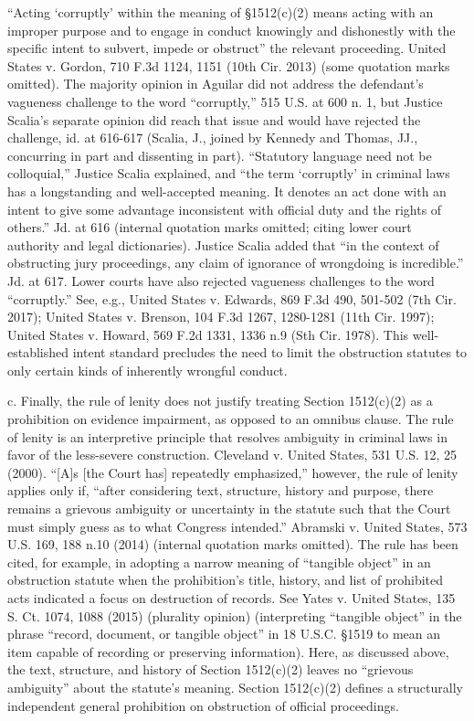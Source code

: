 “Acting ‘corruptly’ within the meaning of \S 1512(c)(2) means acting with an improper purpose and to engage in conduct knowingly and dishonestly with the specific intent to subvert, impede or obstruct” the relevant proceeding.
United States v. Gordon, 710 F.3d 1124, 1151 (10th Cir. 2013) (some quotation marks omitted).
The majority opinion in Aguilar did not address the defendant’s vagueness challenge to the word “corruptly,” 515 U.S. at 600 n. 1, but Justice Scalia’s separate opinion did reach that issue and would have rejected the challenge, id. at 616-617 (Scalia, J., joined by Kennedy and Thomas, JJ., concurring in part and dissenting in part).
“Statutory language need not be colloquial,” Justice Scalia explained, and “the term ‘corruptly’ in criminal laws has a longstanding and well-accepted meaning.
It denotes an act done with an intent to give some advantage inconsistent with official duty and the rights of others.” Jd. at 616 (internal quotation marks omitted; citing lower court authority and legal dictionaries).
Justice Scalia added that “in the context of obstructing jury proceedings, any claim of ignorance of wrongdoing is incredible.” Jd. at 617.
Lower courts have also rejected vagueness challenges to the word “corruptly.” See, e.g., United States v. Edwards, 869 F.3d 490, 501-502 (7th Cir. 2017); United States v. Brenson, 104 F.3d 1267, 1280-1281 (11th Cir. 1997); United States v. Howard, 569 F.2d 1331, 1336 n.9 (Sth Cir. 1978).
This well-established intent standard precludes the need to limit the obstruction statutes to only certain kinds of inherently wrongful conduct.%

c. Finally, the rule of lenity does not justify treating Section 1512(c)(2) as a prohibition on evidence impairment, as opposed to an omnibus clause.
The rule of lenity is an interpretive principle that resolves ambiguity in criminal laws in favor of the less-severe construction.
Cleveland v. United States, 531 U.S. 12, 25 (2000).
“[A]s [the Court has] repeatedly emphasized,” however, the rule of lenity applies only if, “after considering text, structure, history and purpose, there remains a grievous ambiguity or uncertainty in the statute such that the Court must simply guess as to what Congress intended.” Abramski v. United States, 573 U.S. 169, 188 n.10 (2014) (internal quotation marks omitted).
The rule has been cited, for example, in adopting a narrow meaning of “tangible object” in an obstruction statute when the prohibition’s title, history, and list of prohibited acts indicated a focus on destruction of records.
See Yates v. United States, 135 S. Ct. 1074, 1088 (2015) (plurality opinion) (interpreting “tangible object” in the phrase “record, document, or tangible object” in 18 U.S.C. \S 1519 to mean an item capable of recording or preserving information).
Here, as discussed above, the text, structure, and history of Section 1512(c)(2) leaves no “grievous ambiguity” about the statute’s meaning.
Section 1512(c)(2) defines a structurally independent general prohibition on obstruction of official proceedings.

